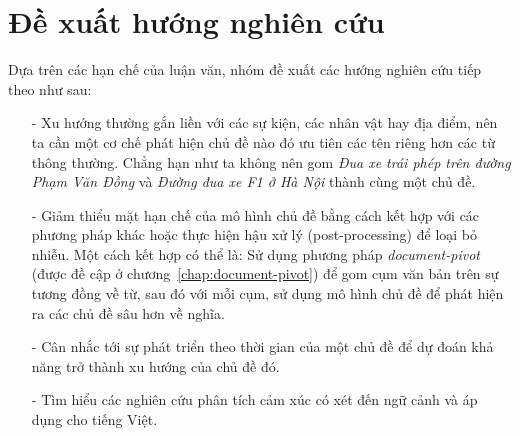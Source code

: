 \section{Đề xuất hướng nghiên cứu}
Dựa trên các hạn chế của luận văn, nhóm đề xuất các hướng nghiên cứu tiếp theo như sau:
\begin{itemize}
    \item[-] Xu hướng thường gắn liền với các sự kiện, các nhân vật hay địa điểm, nên ta cần một cơ chế phát hiện chủ đề nào đó ưu tiên các tên riêng hơn các từ thông thường. Chẳng hạn như ta không nên gom \textit{Đua xe trái phép trên đường Phạm Văn Đồng} và \textit{Đường đua xe F1 ở Hà Nội} thành cùng một chủ đề.
    \item[-] Giảm thiểu mặt hạn chế của mô hình chủ đề bằng cách kết hợp với các phương pháp khác hoặc thực hiện hậu xử lý (post-processing) để loại bỏ nhiễu. Một cách kết hợp có thể là: Sử dụng phương pháp \textit{document-pivot} (được đề cập ở chương~\ref{chap:document-pivot}) để gom cụm văn bản trên sự tương đồng về từ, sau đó với mỗi cụm, sử dụng mô hình chủ đề để phát hiện ra các chủ đề sâu hơn về nghĩa.
    \item[-] Cân nhắc tới sự phát triển theo thời gian của một chủ đề để dự đoán khả năng trở thành xu hướng của chủ đề đó.
    \item[-] Tìm hiểu các nghiên cứu phân tích cảm xúc có xét đến ngữ cảnh và áp dụng cho tiếng Việt.
\end{itemize}
